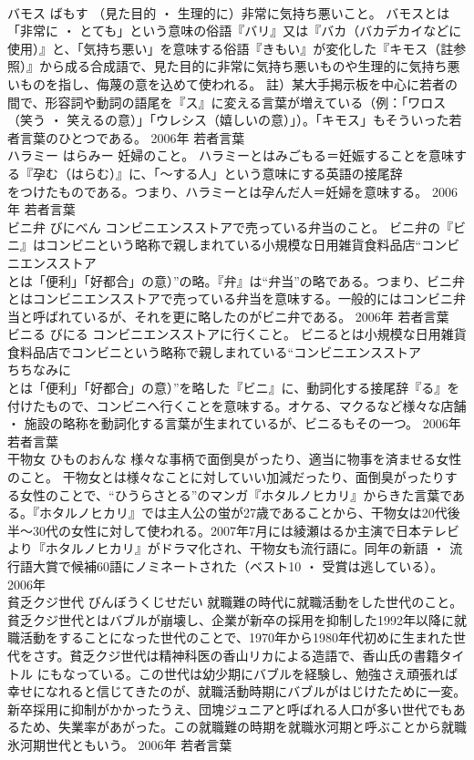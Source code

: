 \documentclass[8pt]{extreport}
\begin{document}
\begin{CJK}{UTF8}{min}
\\	バモス	ばもす	（見た目的 ・ 生理的に）非常に気持ち悪いこと。	バモスとは「非常に ・ とても」という意味の俗語『バリ』又は『バカ（バカデカイなどに使用）』と、「気持ち悪い」を意味する俗語『きもい』が変化した『キモス（註参照）』から成る合成語で、見た目的に非常に気持ち悪いものや生理的に気持ち悪いものを指し、侮蔑の意を込めて使われる。 註）某大手掲示板を中心に若者の間で、形容詞や動詞の語尾を『ス』に変える言葉が増えている（例：「ワロス（笑う ・ 笑えるの意）」「ウレシス（嬉しいの意）」）。「キモス」もそういった若者言葉のひとつである。	2006年	若者言葉	
\\	ハラミー	はらみー	妊婦のこと。	ハラミーとはみごもる＝妊娠することを意味する『孕む（はらむ）』に、「～する人」という意味にする英語の接尾辞
\\	をつけたものである。つまり、ハラミーとは孕んだ人＝妊婦を意味する。	2006年	若者言葉	
\\	ビニ弁	びにべん	コンビニエンスストアで売っている弁当のこと。	ビニ弁の『ビニ』はコンビニという略称で親しまれている小規模な日用雑貨食料品店“コンビニエンスストア
\\	とは「便利」「好都合」の意）”の略。『弁』は“弁当”の略である。つまり、ビニ弁とはコンビニエンスストアで売っている弁当を意味する。一般的にはコンビニ弁当と呼ばれているが、それを更に略したのがビニ弁である。	2006年	若者言葉	
\\	ビニる	びにる	コンビニエンスストアに行くこと。	ビニるとは小規模な日用雑貨食料品店でコンビニという略称で親しまれている“コンビニエンスストア
\\	ちちなみに
\\	とは「便利」「好都合」の意）”を略した『ビニ』に、動詞化する接尾辞『る』を付けたもので、コンビニへ行くことを意味する。オケる、マクるなど様々な店舗 ・ 施設の略称を動詞化する言葉が生まれているが、ビニるもその一つ。	2006年	若者言葉	
\\	干物女	ひものおんな	様々な事柄で面倒臭がったり、適当に物事を済ませる女性のこと。	干物女とは様々なことに対していい加減だったり、面倒臭がったりする女性のことで、“ひうらさとる”のマンガ『ホタルノヒカリ』からきた言葉である。『ホタルノヒカリ』では主人公の蛍が27歳であることから、干物女は20代後半～30代の女性に対して使われる。2007年7月には綾瀬はるか主演で日本テレビより『ホタルノヒカリ』がドラマ化され、干物女も流行語に。同年の新語 ・ 流行語大賞で候補60語にノミネートされた（ベスト10 ・ 受賞は逃している）。	2006年	
\\	貧乏クジ世代	びんぼうくじせだい	就職難の時代に就職活動をした世代のこと。	貧乏クジ世代とはバブルが崩壊し、企業が新卒の採用を抑制した1992年以降に就職活動をすることになった世代のことで、1970年から1980年代初めに生まれた世代をさす。貧乏クジ世代は精神科医の香山リカによる造語で、香山氏の書籍タイトル にもなっている。この世代は幼少期にバブルを経験し、勉強さえ頑張れば幸せになれると信じてきたのが、就職活動時期にバブルがはじけたために一変。新卒採用に抑制がかかったうえ、団塊ジュニアと呼ばれる人口が多い世代でもあるため、失業率があがった。この就職難の時期を就職氷河期と呼ぶことから就職氷河期世代ともいう。	2006年	若者言葉	

\end{CJK}
\end{document}
